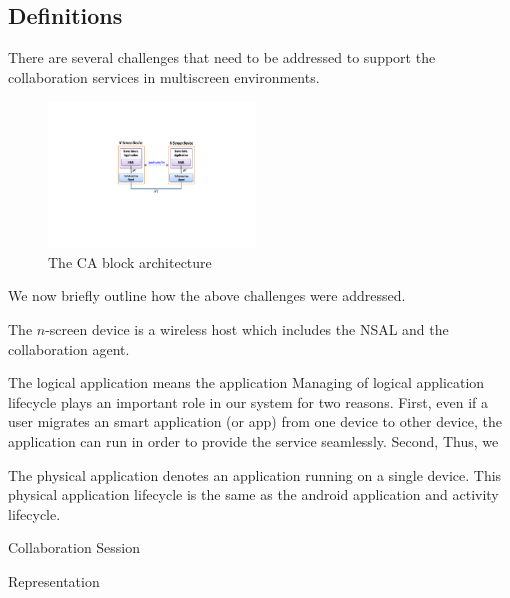 \documentclass{sig-alternate}
\begin{document}

\subsection{Definitions}
There are several challenges that need to be addressed to support the collaboration services in multiscreen environments. 
    \begin{figure}[htb] %
    \centering
    \includegraphics[width=5.5cm,keepaspectratio]{basicmodel}
    \caption{The CA block architecture}
    \label{fig:basicmodel}
    \end{figure}

We now briefly outline how the above challenges were addressed. 

The $n$-screen device is a wireless host which includes the NSAL and the collaboration agent. 

The logical application means the application 
Managing of logical application lifecycle plays an important role in our system for two reasons.
First, even if a user migrates an smart application (or app) from one device to other device, 
the application can run in order to provide the service seamlessly.
Second,
Thus, we 

The physical application denotes an application running on a single device. 
This physical application lifecycle is the same as the android application and activity lifecycle.

Collaboration Session

Representation
\end{document}
